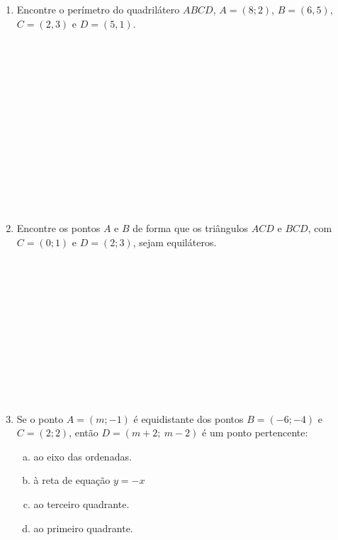 \documentclass[a4paper,14pt]{article}
\begin{document}
\begin{multicols}{2}
\begin{enumerate}
\begin{enumerate}[a)]
            \end{enumerate}
            \item Encontre o perímetro do quadrilátero $ABCD$, $A = (8; 2)$, $B = (6, 5)$, $C = (2, 3)$ e $D = (5, 1)$.\\\\\\\\\\\\\\\\\\\\\\\\\\\\
            \item Encontre os pontos $A$ e $B$ de forma que os triângulos $ACD$ e $BCD$, com $C = (0; 1)$ e $D = (2; 3)$, sejam equiláteros.\\\\\\\\\\\\\\\\\\\\\\\\
            \item Se o ponto $A = (m; -1)$ é equidistante dos pontos $B = (-6; -4)$ e $C = (2; 2)$, então $D = (m + 2;~m - 2)$ é um ponto pertencente:
            \begin{enumerate}[a)]
            	\item ao eixo das ordenadas.
            	\item à reta de equação $y = -x$
            	\item ao terceiro quadrante.
            	\item ao primeiro quadrante.

\end{enumerate}
\end{enumerate}
\end{multicols}
\end{document}
